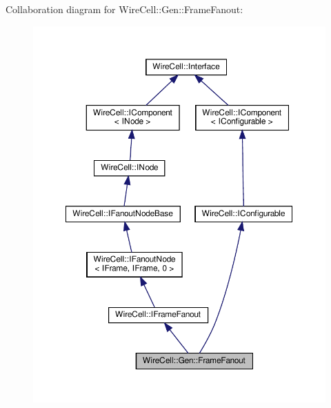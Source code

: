 Collaboration diagram for Wire\+Cell\+:\+:Gen\+:\+:Frame\+Fanout\+:
\nopagebreak
\begin{figure}[H]
\begin{center}
\leavevmode
\includegraphics[width=350pt]{class_wire_cell_1_1_gen_1_1_frame_fanout__coll__graph}
\end{center}
\end{figure}

